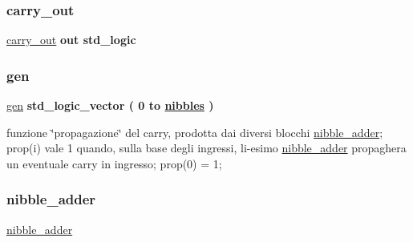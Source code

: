 \subsubsection{\texorpdfstring{carry\+\_\+out}{carry\_out}}
{\footnotesize\ttfamily \hyperlink{group___carry_loockahead_ga851aaea297bdc862fba5478c4bf0e214}{carry\+\_\+out} {\bfseries \textcolor{vhdlchar}{out}\textcolor{vhdlchar}{ }} {\bfseries \textcolor{vhdlchar}{std\+\_\+logic}\textcolor{vhdlchar}{ }} \hspace{0.3cm}{\ttfamily [Port]}}

\mbox{\label{group___carry_loockahead_ga7a68948b7b96c7b51036939fad8e71b3}} 
\subsubsection{\texorpdfstring{gen}{gen}}
{\footnotesize\ttfamily \hyperlink{group___carry_loockahead_ga7a68948b7b96c7b51036939fad8e71b3}{gen} {\bfseries \textcolor{vhdlchar}{std\+\_\+logic\+\_\+vector}\textcolor{vhdlchar}{ }\textcolor{vhdlchar}{(}\textcolor{vhdlchar}{ }\textcolor{vhdlchar}{ } \textcolor{vhdldigit}{0} \textcolor{vhdlchar}{ }\textcolor{vhdlchar}{to}\textcolor{vhdlchar}{ }\textcolor{vhdlchar}{ }\textcolor{vhdlchar}{ }\textcolor{vhdlchar}{ }{\bfseries \hyperlink{group___carry_loockahead_ga0b63b586531492d0fa882246cca071c1}{nibbles}} \textcolor{vhdlchar}{ }\textcolor{vhdlchar}{)}\textcolor{vhdlchar}{ }} \hspace{0.3cm}{\ttfamily [Signal]}}

funzione \char`\"{}propagazione\char`\"{} del carry, prodotta dai diversi blocchi \hyperlink{classnibble__adder}{nibble\+\_\+adder}; prop(i) vale 1 quando, sulla base degli ingressi, l\textquotesingle{}i-\/esimo \hyperlink{classnibble__adder}{nibble\+\_\+adder} propaghera\textquotesingle{} un eventuale carry in ingresso; prop(0) = \textquotesingle{}1\textquotesingle{}; \mbox{\label{group___carry_loockahead_ga98a3a5b152caf0f2de1e31ac60088369}} 
\subsubsection{\texorpdfstring{nibble\+\_\+adder}{nibble\_adder}}
{\footnotesize\ttfamily \hyperlink{group___carry_loockahead_ga98a3a5b152caf0f2de1e31ac60088369}{nibble\+\_\+adder} {\bfseries \textcolor{vhdlchar}{ }} \hspace{0.3cm}{\ttfamily [Component]}}

